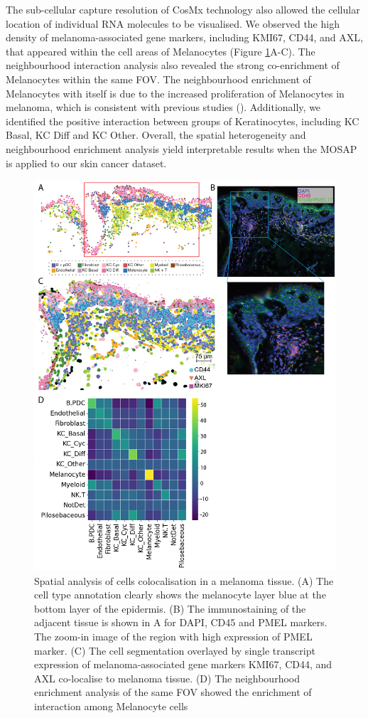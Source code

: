 The sub-cellular capture resolution of CosMx technology also allowed the cellular location of individual RNA molecules to be visualised. We observed the high density of melanoma-associated gene markers, including KMI67, CD44, and AXL, that appeared within the cell areas of Melanocytes (Figure \ref{Chap4:CosMX_transcript_colo}A-C). The neighbourhood interaction analysis also revealed the strong co-enrichment of Melanocytes within the same FOV. The neighbourhood enrichment of Melanocytes with itself is due to the increased proliferation of Melanocytes in melanoma, which is consistent with previous studies (\cite{wang2016crosstalk, shain2016melanocytes}). Additionally, we identified the positive interaction between groups of Keratinocytes, including KC Basal, KC Diff and KC Other. Overall, the spatial heterogeneity and neighbourhood enrichment analysis yield interpretable results when the MOSAP is applied to our skin cancer dataset. 

\begin{figure}
    \centering
    \includegraphics[width=0.85\columnwidth]{Chapter4/Figures/Chapter4_Fig3_CosMx_transcript_colocalisation2.png}
    \caption[Spatial analysis of cells colocalisation in a melanoma tissue]{Spatial analysis of cells colocalisation in a melanoma tissue. (A) The cell type annotation clearly shows the melanocyte layer blue at the bottom layer of the epidermis. (B) The immunostaining of the adjacent tissue is shown in A for DAPI, CD45 and PMEL markers. The zoom-in image of the region with high expression of PMEL marker. (C) The cell segmentation overlayed by single transcript expression of melanoma-associated gene markers KMI67, CD44, and AXL co-localise to melanoma tissue. (D) The neighbourhood enrichment analysis of the same FOV showed the enrichment of interaction among Melanocyte cells }
    \label{Chap4:CosMX_transcript_colo}
    
\end{figure}

